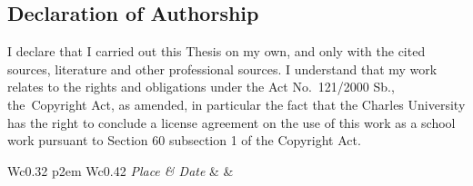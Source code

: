 
\cleardoublepage
{}
\vspace*{\fill}

\subsection*{Declaration of Authorship}

I declare that I carried out this \ThesisType{} Thesis on my own, and only with the cited sources, literature and other professional sources.
I understand that my work relates to the rights and obligations under the Act No.~121/2000 Sb., the~Copyright Act, as amended, in particular the fact that the Charles University has the right to conclude a license agreement on the use of this work as a school work pursuant to Section 60 subsection 1 of the Copyright Act.

\vspace{7ex}

\begin{center}
    \renewcommand{\arraystretch}{1.3}
    \begin{tabular}{W{c}{0.32\linewidth} p{2em} W{c}{0.42\linewidth}}
        \emph{\textsf{Place \& Date}} &  & \emph{\textsf{\ThesisAuthor}} \\
    \end{tabular}
\end{center}

\vspace{5em}
\newpage
